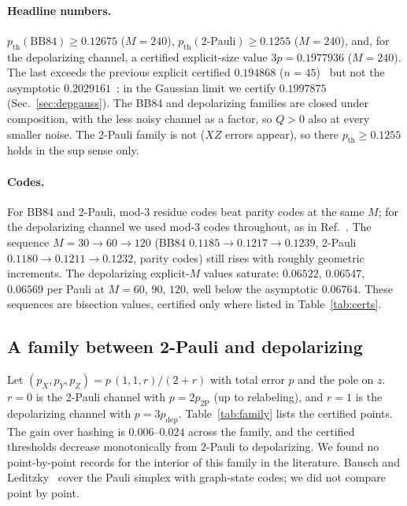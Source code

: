 \documentclass[aps,pra,reprint,superscriptaddress,nofootinbib,longbibliography,floatfix]{revtex4-2}
\theoremstyle{remark}
\begin{document}
\paragraph*{Headline numbers.} $p_{\mathrm{th}}(\text{BB84})\ge0.12675$ ($M=240$),
$p_{\mathrm{th}}(\text{2-Pauli})\ge0.1255$ ($M=240$), and, for the depolarizing channel, a certified
explicit-size value $3p=0.1977936$ ($M=240$). The last exceeds the previous explicit certified
$0.194868$ ($n=45$)~\cite{krohn2026certified} but not the asymptotic $0.2029161$~\cite{ahmed2026choir};
in the Gaussian limit we certify $0.1997875$ (Sec.~\ref{sec:depgauss}).
The BB84 and depolarizing families are closed under composition, with the less noisy channel as a
factor, so $Q>0$ also at every smaller noise. The 2-Pauli family is not ($XZ$ errors appear), so there
$p_{\mathrm{th}}\ge0.1255$ holds in the sup sense only.

\paragraph*{Codes.} For BB84 and 2-Pauli, mod-3 residue codes beat parity codes at the same $M$; for the
depolarizing channel we used mod-3 codes throughout, as in Ref.~\cite{ahmed2026choir}. The
sequence $M=30\to60\to120$ (BB84 $0.1185\to0.1217\to0.1239$, 2-Pauli $0.1180\to0.1211\to0.1232$, parity
codes) still rises with roughly geometric increments. The depolarizing explicit-$M$ values saturate:
$0.06522$, $0.06547$, $0.06569$ per Pauli at $M=60$, $90$, $120$, well below the asymptotic $0.06764$.
These sequences are bisection values, certified only where listed in Table~\ref{tab:certs}.

\subsection{A family between 2-Pauli and depolarizing}
\label{sec:family}
Let $(p_X,p_Y,p_Z)=p\,(1,1,r)/(2+r)$ with total error $p$ and the pole on $z$. $r=0$ is the 2-Pauli
channel with $p=2p_{\mathrm{2P}}$ (up to relabeling), and $r=1$ is the depolarizing channel with $p=3p_{\mathrm{dep}}$.
Table~\ref{tab:family} lists the certified points. The gain over hashing is $0.006$--$0.024$ across the
family, and the certified thresholds decrease monotonically from 2-Pauli to depolarizing. We found no
point-by-point records for the interior of this family in the literature. Bausch and
Leditzky~\cite{bausch2021pauli} cover the Pauli simplex with graph-state codes; we did not compare point
by point.
\end{document}
